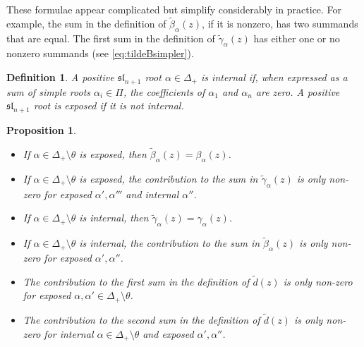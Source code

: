 \documentclass[10pt,a4paper]{amsart}
\numberwithin{equation}{section}
\newcommand{\alg}[1]{\mathfrak{#1}}  %
\newcommand{\SLA}[2]{\alg{#1}_{#2}}                      %
\newcommand{\slnpone}{\SLA{sl}{n+1}}
\newcommand{\proots}{\Delta_+}                                       %
\newcommand{\sroots}{\Pi}                                            %
\newcommand{\sroot}[1]{\alpha_{#1}}                                  %
\newcommand{\hroot}{\theta}                                          %
\theoremstyle{plain}
\newtheorem{proposition}[theorem]{Proposition}
\newtheorem{definition}[theorem]{Definition}
\begin{document}
These formulae appear complicated but simplify considerably in practice. For example, the sum in the definition of $\tilde{\beta}_\alpha(z)$, if it is nonzero, has two summands that are equal. The first sum in the definition of $\tilde{\gamma}_\alpha(z)$ has either one or no nonzero summands (see \eqref{eq:tildeBsimpler}). 


\begin{definition}
A positive $\slnpone$ root $\alpha \in \proots$ is \emph{internal} if, when expressed as a sum of simple roots $\sroot{i} \in \sroots$, the coefficients of $\alpha_1$ and $\alpha_n$ are zero. A positive $\slnpone$ root is \emph{exposed} if it is not internal. 
\end{definition}

\begin{proposition} \label{lem:InternalExposed}
\begin{itemize}
    \item If $\alpha \in \proots \setminus \hroot$ is exposed, then $\tilde{\beta}_\alpha(z) = \beta_\alpha(z)$.
    \item If $\alpha \in \proots \setminus \hroot$ is exposed, the contribution to the sum in $\tilde{\gamma}_\alpha(z)$ is only non-zero for exposed $\alpha',\alpha'''$ and internal $\alpha''$.
    \item If $\alpha \in \proots \setminus \hroot$ is internal, then $\tilde{\gamma}_\alpha(z) = \gamma_\alpha(z)$.
    \item If $\alpha \in \proots \setminus \hroot$ is internal, the contribution to the sum in $\tilde{\beta}_\alpha(z)$ is only non-zero for exposed $\alpha', \alpha''$.
    \item The contribution to the first sum in the definition of $\tilde{d}(z)$ is only non-zero for exposed $\alpha, \alpha' \in \proots \setminus \hroot$.
    \item The contribution to the second sum in the definition of $\tilde{d}(z)$ is only non-zero for internal $\alpha \in \proots \setminus \hroot$ and exposed $\alpha', \alpha''$.
\end{itemize} 
\end{proposition}
\end{document}
